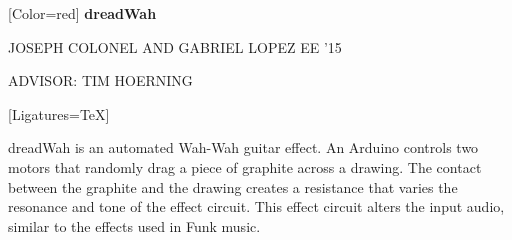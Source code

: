 \documentclass{article}
\begin{document}
{
	[Color=red]
	\fontsize{0.8in}{0.4in}\selectfont 
	\bfseries
	dreadWah
}

\vspace{0.25in}

{
	\fontsize{0.55in}{0.6in}\selectfont
	JOSEPH COLONEL {\fontsize{0.4in}{0.6in}\selectfont AND} GABRIEL LOPEZ {\fontsize{0.4in}{0.6in}\selectfont EE '15}
}

\vspace{0.1in}

{
	\fontsize{0.4in}{0.4in}\selectfont
	ADVISOR: TIM HOERNING
}

\vspace{0.2in}

{
	[Ligatures=TeX]
	\fontsize{0.41in}{0.46in}\selectfont

		dreadWah is an automated Wah-Wah guitar effect. An Arduino controls
		two motors that randomly drag a piece of graphite across a drawing.
		The contact between the graphite and the drawing creates a resistance
		that varies the resonance and tone of the effect circuit. This effect
		circuit alters the input audio, similar to the effects used in Funk
		music.

}
\end{document}
